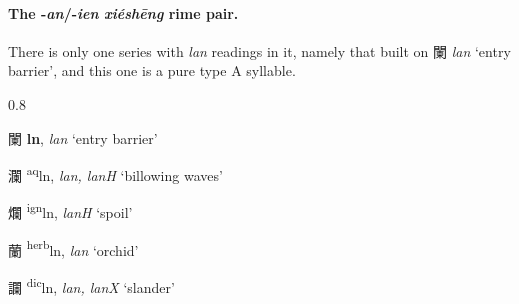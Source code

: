\paragraph{The -\textit{an}/-\textit{ien} \textit{xiéshēng} rime pair.}
\label{par:an-ien-XS-pair}

There is only one series with \textit{lan} readings in it, namely that built on
闌 \textit{lan} `entry barrier',
and this one is a pure type A syllable. 


\begin{itemize}
\setlength{\itemsep}{0.2em}
\begin{spacing}{0.8}  
\item {\Large{闌}} %
{\large{\textbf{ln}}},
\textit{lan} `entry barrier' %

\item {\Large{瀾}} %
{\large{{\textsuperscript{aq}}ln}},
\textit{lan, lanH} `billowing waves' %

\item {\Large{爛}} %
{\large{{\textsuperscript{ign}}ln}},
\textit{lanH} `spoil' %




\item {\Large{蘭}} %
{\large{{\textsuperscript{herb}}ln}},
\textit{lan} `orchid' %

\item {\Large{讕}} %
{\large{{\textsuperscript{dic}}ln}},
\textit{lan, lanX} `slander' %

\end{spacing}
\end{itemize}





